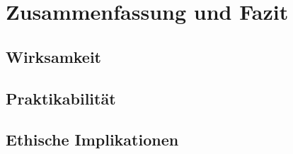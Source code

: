 \chapter{Zusammenfassung und Fazit}
\label{chap:fazit}


\section{Wirksamkeit}

\section{Praktikabilität}

\section{Ethische Implikationen}
